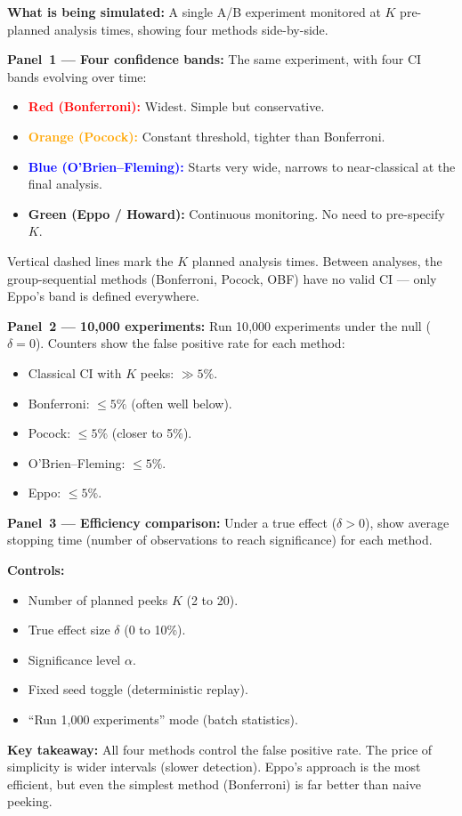 \documentclass[12pt, a4paper]{article}
\begin{document}
\begin{simulation}
\textbf{What is being simulated:}
A single A/B experiment monitored at $K$ pre-planned analysis times, showing
four methods side-by-side.

\textbf{Panel~1 --- Four confidence bands:}
The same experiment, with four CI bands evolving over time:
\begin{itemize}[nosep]
  \item \textcolor{red}{\textbf{Red (Bonferroni):}} Widest.  Simple but
        conservative.
  \item \textcolor{orange}{\textbf{Orange (Pocock):}} Constant threshold,
        tighter than Bonferroni.
  \item \textcolor{blue}{\textbf{Blue (O'Brien--Fleming):}} Starts very wide,
        narrows to near-classical at the final analysis.
  \item \textcolor{green!60!black}{\textbf{Green (Eppo / Howard):}}
        Continuous monitoring.  No need to pre-specify $K$.
\end{itemize}

Vertical dashed lines mark the $K$ planned analysis times.  Between analyses,
the group-sequential methods (Bonferroni, Pocock, OBF) have no valid CI ---
only Eppo's band is defined everywhere.

\textbf{Panel~2 --- 10{,}000 experiments:}
Run 10{,}000 experiments under the null ($\delta = 0$).  Counters show the
false positive rate for each method:
\begin{itemize}[nosep]
  \item Classical CI with $K$ peeks: $\gg 5\%$.
  \item Bonferroni: $\leq 5\%$ (often well below).
  \item Pocock: $\leq 5\%$ (closer to 5\%).
  \item O'Brien--Fleming: $\leq 5\%$.
  \item Eppo: $\leq 5\%$.
\end{itemize}

\textbf{Panel~3 --- Efficiency comparison:}
Under a true effect ($\delta > 0$), show average stopping time (number of
observations to reach significance) for each method.

\textbf{Controls:}
\begin{itemize}[nosep]
  \item Number of planned peeks $K$ (2 to 20).
  \item True effect size $\delta$ (0 to 10\%).
  \item Significance level $\alpha$.
  \item Fixed seed toggle (deterministic replay).
  \item ``Run 1{,}000 experiments'' mode (batch statistics).
\end{itemize}

\textbf{Key takeaway:}
All four methods control the false positive rate.  The price of simplicity
is wider intervals (slower detection).  Eppo's approach is the most
efficient, but even the simplest method (Bonferroni) is far better than
naive peeking.
\end{simulation}
\end{document}

